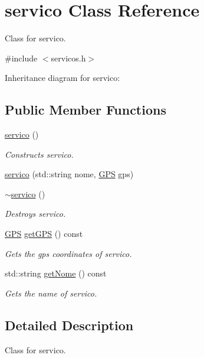 \hypertarget{classservico}{}\section{servico Class Reference}
\label{classservico}


Class for servico.  




{\ttfamily \#include $<$servicos.\+h$>$}



Inheritance diagram for servico\+:
\subsection*{Public Member Functions}
\begin{DoxyCompactItemize}
\item 
\hyperlink{classservico_a837726f124d36d4423d055a273e086f9}{servico} ()
\begin{DoxyCompactList}\small\item\em Constructs servico. \end{DoxyCompactList}\item 
\hyperlink{classservico_a01a4ad0dcdd94469284e5434bd10987f}{servico} (std\+::string nome, \hyperlink{classGPS}{G\+PS} gps)
\item 
\hyperlink{classservico_a15b4437fe13c5a4674cb6ae87d18ff9c}{$\sim$servico} ()
\begin{DoxyCompactList}\small\item\em Destroys servico. \end{DoxyCompactList}\item 
\hyperlink{classGPS}{G\+PS} \hyperlink{classservico_a4d920c753492f5c2656464c316fba561}{get\+G\+PS} () const 
\begin{DoxyCompactList}\small\item\em Gets the gps coordinates of servico. \end{DoxyCompactList}\item 
std\+::string \hyperlink{classservico_a7ebbde70f1d4a4f2651b9ec6f6b2a5e5}{get\+Nome} () const 
\begin{DoxyCompactList}\small\item\em Gets the name of servico. \end{DoxyCompactList}\end{DoxyCompactItemize}


\subsection{Detailed Description}
Class for servico. 

